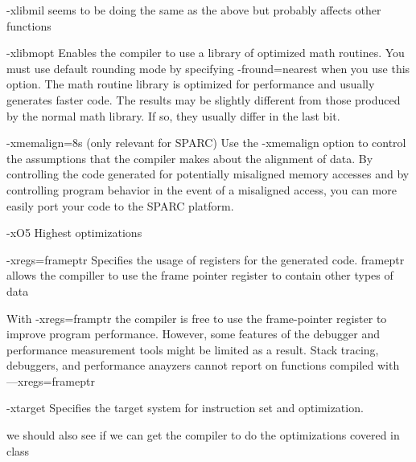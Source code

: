 -xlibmil seems to be doing the same as the above but probably affects other functions

-xlibmopt
Enables the compiler to use a library of optimized math routines. You must use default rounding mode by specifying -fround=nearest when you use this option.
The math routine library is optimized for performance and usually generates faster code. The results may be slightly different from those produced by the normal math library. If so, they usually differ in the last bit.

-xmemalign=8s (only relevant for SPARC)
Use the -xmemalign option to control the assumptions that the compiler makes about the alignment of data. By controlling the code generated for potentially misaligned memory accesses and by controlling program behavior in the event of a misaligned access, you can more easily port your code to the SPARC platform.

-xO5
Highest optimizations

-xregs=frameptr
Specifies the usage of registers for the generated code.
frameptr allows the compiller to use the frame pointer register to contain other types of data

With -xregs=framptr the compiler is free to use the frame-pointer register to improve program performance. However, some features of the debugger and performance measurement tools might be limited as a result. Stack tracing, debuggers, and performance anayzers cannot report on functions compiled with —xregs=frameptr

-xtarget 
Specifies the target system for instruction set and optimization. 

we should also see if we can get the compiler to do the optimizations covered in class